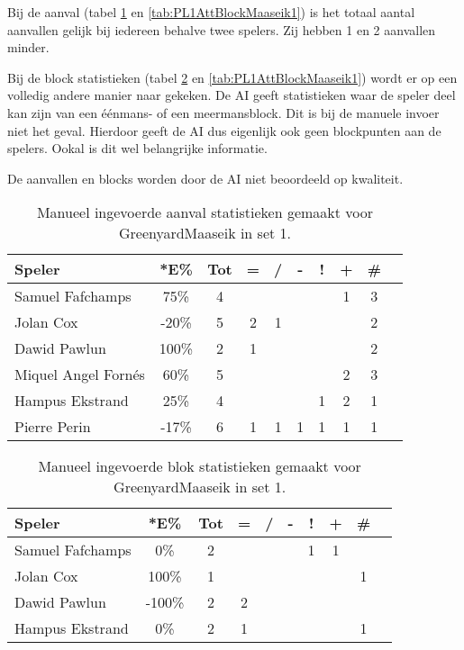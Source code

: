 Bij de aanval (tabel \ref{tab:PL1AttMaaseikMan1} en \ref{tab:PL1AttBlockMaaseik1}) is het totaal aantal aanvallen gelijk bij iedereen behalve twee spelers. Zij hebben 1 en 2 aanvallen minder.

Bij de block statistieken (tabel \ref{tab:PL1BlockMaaseikMan1} en \ref{tab:PL1AttBlockMaaseik1}) wordt er op een volledig andere manier naar gekeken. De AI geeft statistieken waar de speler deel kan zijn van een éénmans- of een meermansblock. Dit is bij de manuele invoer niet het geval. Hierdoor geeft de AI dus eigenlijk ook geen blockpunten aan de spelers. Ookal is dit wel belangrijke informatie.

De aanvallen en blocks worden door de AI niet beoordeeld op kwaliteit.

\begin{table}[ht!]
    \centering
    \scriptsize
    \begin{tabular}{|l|c|c|c|c|c|c|c|c|c|}
        \hline
        \textbf{Speler} & *E\% & Tot & = & / & - & ! & + & \# \\ \hline
        Samuel Fafchamps & 75\% & 4 &  &  &  &  & 1 & 3 \\ 
        Jolan Cox & -20\% & 5 & 2 & 1 &  &  &  & 2 \\ 
        Dawid Pawlun  & 100\% & 2 & 1 &  &  &  &  & 2 \\ 
        Miquel Angel Fornés & 60\% & 5 &  &  &  &  & 2 & 3 \\
        Hampus Ekstrand & 25\% & 4 &  &  &  & 1 & 2 & 1 \\ 
        Pierre Perin & -17\% & 6 & 1 & 1 & 1 & 1 & 1 & 1 \\ \hline
    \end{tabular}
    \caption[Manueel ingevoerde aanval statistieken gemaakt GreenyardMaaseik in set 1]{\label{tab:PL1AttMaaseikMan1}Manueel ingevoerde aanval statistieken gemaakt voor GreenyardMaaseik in set 1.}
\end{table}

\begin{table}[ht!]
    \centering
    \scriptsize
    \begin{tabular}{|l|c|c|c|c|c|c|c|c|c|}
        \hline
        \textbf{Speler} & *E\% & Tot & = & / & - & ! & + & \# \\ \hline
        Samuel Fafchamps & 0\% & 2 &  &  &  & 1 & 1 &  \\ 
        Jolan Cox & 100\% & 1 &  &  &  &  &  & 1 \\ 
        Dawid Pawlun & -100\% & 2 & 2 &  &  &  &  &  \\ 
        Hampus Ekstrand & 0\% & 2 & 1 &  &  &  &  & 1 \\ \hline
    \end{tabular}
    \caption[Manueel ingevoerde blok statistieken gemaakt GreenyardMaaseik in set 1]{\label{tab:PL1BlockMaaseikMan1}Manueel ingevoerde blok statistieken gemaakt voor GreenyardMaaseik in set 1.}
\end{table}

